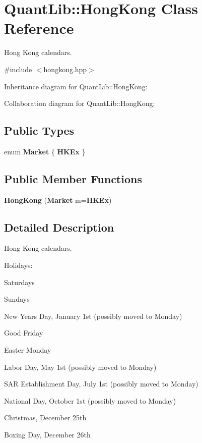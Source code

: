 \section{Quant\+Lib\+:\+:Hong\+Kong Class Reference}
\label{class_quant_lib_1_1_hong_kong}


Hong Kong calendars.  




{\ttfamily \#include $<$hongkong.\+hpp$>$}



Inheritance diagram for Quant\+Lib\+:\+:Hong\+Kong\+:


Collaboration diagram for Quant\+Lib\+:\+:Hong\+Kong\+:
\subsection*{Public Types}
\begin{DoxyCompactItemize}
\item 
enum {\bf Market} \{ {\bf H\+K\+Ex}
 \}
\end{DoxyCompactItemize}
\subsection*{Public Member Functions}
\begin{DoxyCompactItemize}
\item 
{\bf Hong\+Kong} ({\bf Market} m={\bf H\+K\+Ex})
\end{DoxyCompactItemize}


\subsection{Detailed Description}
Hong Kong calendars. 

Holidays\+: 
\begin{DoxyItemize}
\item Saturdays 
\item Sundays 
\item New Year\textquotesingle{}s Day, January 1st (possibly moved to Monday) 
\item Good Friday 
\item Easter Monday 
\item Labor Day, May 1st (possibly moved to Monday) 
\item S\+AR Establishment Day, July 1st (possibly moved to Monday) 
\item National Day, October 1st (possibly moved to Monday) 
\item Christmas, December 25th 
\item Boxing Day, December 26th 
\end{DoxyItemize}


